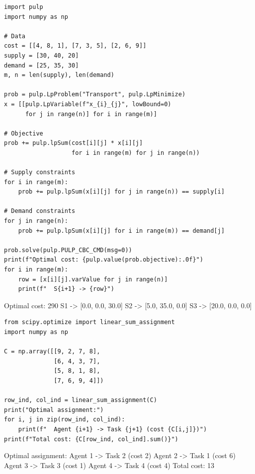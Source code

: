 \begin{codeblock}[title=\textbf{Transportation problem with PuLP}]
\begin{verbatim}
import pulp
import numpy as np

# Data
cost = [[4, 8, 1], [7, 3, 5], [2, 6, 9]]
supply = [30, 40, 20]
demand = [25, 35, 30]
m, n = len(supply), len(demand)

prob = pulp.LpProblem("Transport", pulp.LpMinimize)
x = [[pulp.LpVariable(f"x_{i}_{j}", lowBound=0)
      for j in range(n)] for i in range(m)]

# Objective
prob += pulp.lpSum(cost[i][j] * x[i][j]
                   for i in range(m) for j in range(n))

# Supply constraints
for i in range(m):
    prob += pulp.lpSum(x[i][j] for j in range(n)) == supply[i]

# Demand constraints
for j in range(n):
    prob += pulp.lpSum(x[i][j] for i in range(m)) == demand[j]

prob.solve(pulp.PULP_CBC_CMD(msg=0))
print(f"Optimal cost: {pulp.value(prob.objective):.0f}")
for i in range(m):
    row = [x[i][j].varValue for j in range(n)]
    print(f"  S{i+1} -> {row}")
\end{verbatim}
\end{codeblock}

\begin{codeoutput}
Optimal cost: 290
  S1 -> [0.0, 0.0, 30.0]
  S2 -> [5.0, 35.0, 0.0]
  S3 -> [20.0, 0.0, 0.0]
\end{codeoutput}

\begin{codeblock}[title=\textbf{Assignment problem with SciPy}]
\begin{verbatim}
from scipy.optimize import linear_sum_assignment
import numpy as np

C = np.array([[9, 2, 7, 8],
              [6, 4, 3, 7],
              [5, 8, 1, 8],
              [7, 6, 9, 4]])

row_ind, col_ind = linear_sum_assignment(C)
print("Optimal assignment:")
for i, j in zip(row_ind, col_ind):
    print(f"  Agent {i+1} -> Task {j+1} (cost {C[i,j]})")
print(f"Total cost: {C[row_ind, col_ind].sum()}")
\end{verbatim}
\end{codeblock}

\begin{codeoutput}
Optimal assignment:
  Agent 1 -> Task 2 (cost 2)
  Agent 2 -> Task 1 (cost 6)
  Agent 3 -> Task 3 (cost 1)
  Agent 4 -> Task 4 (cost 4)
Total cost: 13
\end{codeoutput}

